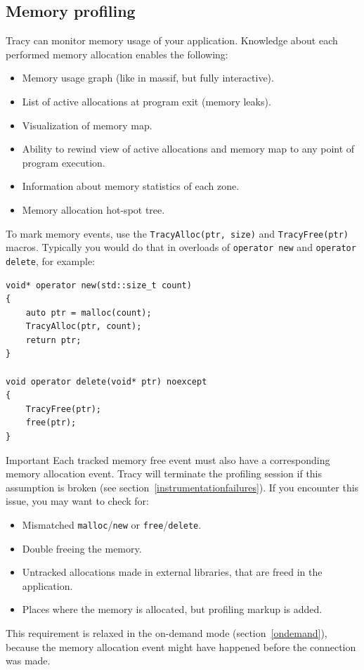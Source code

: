 \documentclass[hidelinks,titlepage,a4paper]{article}
\begin{document}
\subsection{Memory profiling}
\label{memoryprofiling}

Tracy can monitor memory usage of your application. Knowledge about each performed memory allocation enables the following:

\begin{itemize}
\item Memory usage graph (like in massif, but fully interactive).
\item List of active allocations at program exit (memory leaks).
\item Visualization of memory map.
\item Ability to rewind view of active allocations and memory map to any point of program execution.
\item Information about memory statistics of each zone.
\item Memory allocation hot-spot tree.
\end{itemize}

To mark memory events, use the \texttt{TracyAlloc(ptr, size)} and \texttt{TracyFree(ptr)} macros. Typically you would do that in overloads of \texttt{operator new} and \texttt{operator delete}, for example:

\begin{lstlisting}
void* operator new(std::size_t count)
{
    auto ptr = malloc(count);
    TracyAlloc(ptr, count);
    return ptr;
}

void operator delete(void* ptr) noexcept
{
    TracyFree(ptr);
    free(ptr);
}
\end{lstlisting}

\begin{bclogo}[
noborder=true,
couleur=black!5,
logo=\bcbombe
]{Important}
Each tracked memory free event must also have a corresponding memory allocation event. Tracy will terminate the profiling session if this assumption is broken (see section~\ref{instrumentationfailures}). If you encounter this issue, you may want to check for:

\begin{itemize}
\item Mismatched \texttt{malloc}/\texttt{new} or \texttt{free}/\texttt{delete}.
\item Double freeing the memory.
\item Untracked allocations made in external libraries, that are freed in the application.
\item Places where the memory is allocated, but profiling markup is added.
\end{itemize}

This requirement is relaxed in the on-demand mode (section~\ref{ondemand}), because the memory allocation event might have happened before the connection was made.
\end{bclogo}
\end{document}
